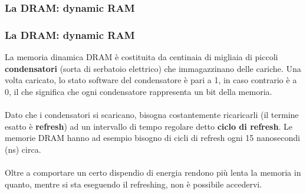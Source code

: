 \subsubsection[La DRAM: dynamic RAM]{La DRAM: dynamic RAM}
\begin{frame}
	\frametitle{La DRAM: dynamic RAM}
	  
	\begin{block}{}
		La memoria dinamica DRAM è costituita da centinaia di migliaia di piccoli \textbf{condensatori} (sorta di serbatoio elettrico) che immagazzinano delle cariche. Una volta caricato, lo stato software del condensatore è pari a 1, in caso contrario è a 0, il che significa che ogni condensatore rappresenta un bit della memoria.\\~\\
		Dato che i condensatori si scaricano, bisogna costantemente ricaricarli (il termine esatto è \textbf{refresh}) ad un intervallo di tempo regolare detto \textbf{ciclo di refresh}. Le memorie DRAM hanno ad esempio bisogno di cicli di refresh ogni 15 nanosecondi (ns) circa.\\~\\
		
		Oltre a comportare un certo dispendio di energia rendono più lenta la memoria in quanto, mentre si sta eseguendo il refreshing, non è possibile accedervi.
	\end{block}
\end{frame}

